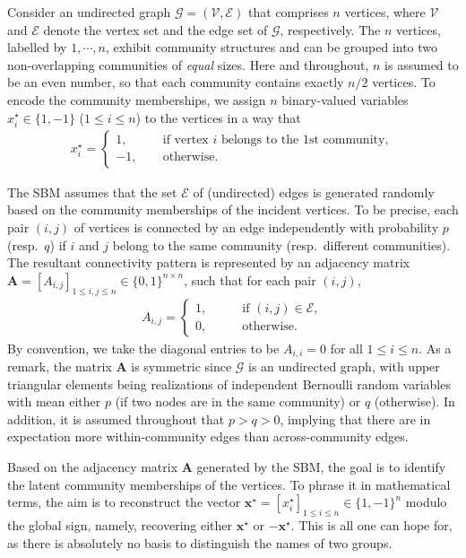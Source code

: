 Consider an undirected graph $\mathcal{G}=(\mathcal{V},\mathcal{E})$ that comprises $n$ vertices, where $\mathcal{V}$ and   $\mathcal{E}$ denote the vertex set and the edge set of $\mathcal{G}$, respectively.  The $n$ vertices, labelled by $1,\cdots, n$,
exhibit  community structures and can be grouped into two non-overlapping communities of {\em equal} sizes. Here and throughout,  $n$ is assumed to be an even number, so that each community contains exactly $n/2$ vertices.
To encode the community memberships, we assign $n$ binary-valued variables $x_i^{\star} \in \{1,-1\}$ ($1\leq i \leq n$) to the  vertices in a way that
%
\begin{align*}
	x_i^{\star} = \begin{cases} 1, \qquad & \text{if vertex } i \text{ belongs to the 1st community}, \\
				   -1, \quad  & \text{otherwise}. \end{cases}
\end{align*}
%




The SBM assumes that the set $\mathcal{E}$ of (undirected) edges  is generated randomly based on the community memberships of the incident vertices. To be precise, each pair $(i,j)$ of vertices  is  connected by an edge independently with probability $p$ (resp.~$q$) if $i$ and $j$ belong to the same community (resp.~different communities). The resultant connectivity pattern is represented by an adjacency matrix
$\bm{A}=[A_{i,j}]_{1\leq i,j\leq n}\in \{0,1\}^{n\times n}$, such that for each pair $(i,j)$,
%
\begin{align}
	A_{i,j} = \begin{cases} 1, \qquad & \text{if }(i,j)\in \mathcal{E}, \\ 0, & \text{otherwise}.   \end{cases}
\end{align}
%
By convention, we take the diagonal entries to be $A_{i,i}=0$ for all $1\leq i\leq n$. As a remark, the matrix $\bm{A}$ is symmetric since $\mathcal{G}$ is an undirected graph,  with upper triangular elements being realizations of independent Bernoulli random variables with mean either $p$ (if two nodes are in the same community) or $q$ (otherwise).  In addition, it is assumed throughout that $p>q>0$, implying that there are in expectation more within-community edges than across-community edges.

Based on the adjacency matrix $\bm{A}$ generated by the SBM,
the goal is to identify the latent community memberships of the vertices. To phrase it in mathematical terms,
the aim is to reconstruct the vector  $\bm{x}^{\star}=[x_i^{\star}]_{1\leq i\leq n}\in \{1,-1\}^n$ modulo the global sign,
namely, recovering either $\bm{x}^{\star}$ or $-\bm{x}^{\star}$.
This is all one can hope for, as there is
absolutely no basis to distinguish the names of two groups.




